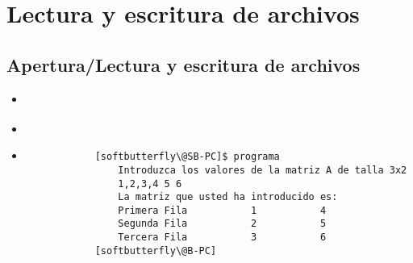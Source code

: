
\section{Lectura y escritura de archivos}  


\subsection{Apertura/Lectura y escritura de archivos}

\begin{frame}[fragile]{} 
    \begin{itemize}[<+(0)->]
        \item [] \textbf{}
        \item 
        \item 
            \vspace{0.1cm}
            \begin{verbatim}
            [softbutterfly\@SB-PC]$ programa    
                Introduzca los valores de la matriz A de talla 3x2
                1,2,3,4 5 6
                La matriz que usted ha introducido es:
                Primera Fila           1           4
                Segunda Fila           2           5
                Tercera Fila           3           6
            [softbutterfly\@B-PC]  
            \end{verbatim}
    \end{itemize}
\end{frame}